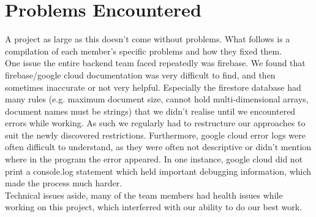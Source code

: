 \section{Problems Encountered}
A project as large as this doesn't come without problems. What follows is a compilation of each member's specific problems and how they fixed them. \\

One issue the entire backend team faced repeatedly was firebase. We found that firebase/google cloud documentation was very difficult to find, and then sometimes inaccurate or not very helpful.
Especially the firestore database had many rules (e.g. maximum document size, cannot hold multi-dimensional arrays, document names must be strings) that we didn't realise until we encountered errors while working. 
As such we regularly had to restructure our approaches to suit the newly discovered restrictions. 
Furthermore, google cloud error logs were often difficult to understand, as they were often not descriptive or didn't mention where in the program the error appeared. In one instance, google cloud did not print a console.log statement which held important debugging information, which made the process much harder.\\
Technical issues aside, many of the team members had health issues while working on this project, which interferred with our ability to do our best work.





